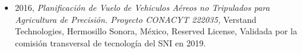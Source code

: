 \begin{itemize} 
\item 2016, \textit{ Planificación de Vuelo de Vehiculos Aéreos no Tripulados para Agricultura de Precisión. Proyecto CONACYT 222035,} Verstand Technologies, Hermosillo Sonora, México, Reserved License, Validada por la comisión transversal de tecnología del SNI en 2019. 
\end{itemize} 
